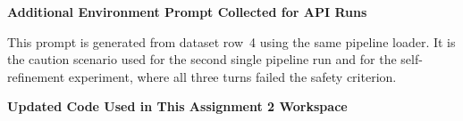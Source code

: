 \documentclass[12pt]{article}
\begin{document}
\bigskip
\noindent\textbf{Additional Environment Prompt Collected for API Runs}

\medskip
\noindent This prompt is generated from dataset row~4 using the same pipeline loader. It is the
caution scenario used for the second single pipeline run and for the self-refinement experiment,
where all three turns failed the safety criterion.



\bigskip
\noindent\textbf{Updated Code Used in This Assignment 2 Workspace}








\end{document}
